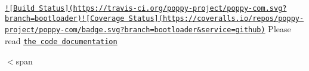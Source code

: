 \href{https://travis-ci.org/poppy-project/poppy-com}{\tt !\mbox{[}Build Status\mbox{]}(https\-://travis-\/ci.\-org/poppy-\/project/poppy-\/com.\-svg?branch=bootloader)}\href{https://coveralls.io/github/poppy-project/poppy-com?branch=bootloader}{\tt !\mbox{[}Coverage Status\mbox{]}(https\-://coveralls.\-io/repos/poppy-\/project/poppy-\/com/badge.\-svg?branch=bootloader\&service=github)} Please read \href{http://poppy-project.github.io/poppy-com/}{\tt the code documentation}

$<$span 